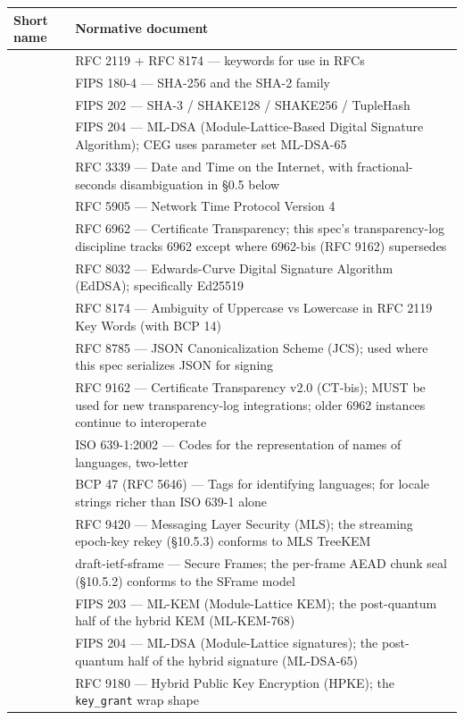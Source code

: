 \documentclass[10pt]{article}
\begin{document}
{\footnotesize
\begin{longtable}{|p{8.0cm}|p{8.0cm}|}\hline
\textbf{Short name} & \textbf{Normative document} \\ \hline\endhead
[BCP 14] & RFC 2119 + RFC 8174 — keywords for use in RFCs \\ \hline
[FIPS-180-4] & FIPS 180-4 — SHA-256 and the SHA-2 family \\ \hline
[FIPS-202] & FIPS 202 — SHA-3 / SHAKE128 / SHAKE256 / TupleHash \\ \hline
[FIPS-204] & FIPS 204 — ML-DSA (Module-Lattice-Based Digital Signature Algorithm); CEG uses parameter set ML-DSA-65 \\ \hline
[RFC-3339] & RFC 3339 — Date and Time on the Internet, with fractional-seconds disambiguation in §0.5 below \\ \hline
[RFC-5905] & RFC 5905 — Network Time Protocol Version 4 \\ \hline
[RFC-6962] & RFC 6962 — Certificate Transparency; this spec's transparency-log discipline tracks 6962 except where 6962-bis (RFC 9162) supersedes \\ \hline
[RFC-8032] & RFC 8032 — Edwards-Curve Digital Signature Algorithm (EdDSA); specifically Ed25519 \\ \hline
[RFC-8174] & RFC 8174 — Ambiguity of Uppercase vs Lowercase in RFC 2119 Key Words (with BCP 14) \\ \hline
[RFC-8785] & RFC 8785 — JSON Canonicalization Scheme (JCS); used where this spec serializes JSON for signing \\ \hline
[RFC-9162] & RFC 9162 — Certificate Transparency v2.0 (CT-bis); MUST be used for new transparency-log integrations; older 6962 instances continue to interoperate \\ \hline
[ISO-639-1] & ISO 639-1:2002 — Codes for the representation of names of languages, two-letter \\ \hline
[BCP-47] & BCP 47 (RFC 5646) — Tags for identifying languages; for locale strings richer than ISO 639-1 alone \\ \hline
[RFC-9420] & RFC 9420 — Messaging Layer Security (MLS); the streaming epoch-key rekey (§10.5.3) conforms to MLS TreeKEM \\ \hline
[SFrame] & draft-ietf-sframe — Secure Frames; the per-frame AEAD chunk seal (§10.5.2) conforms to the SFrame model \\ \hline
[FIPS-203] & FIPS 203 — ML-KEM (Module-Lattice KEM); the post-quantum half of the hybrid KEM (ML-KEM-768) \\ \hline
[FIPS-204] & FIPS 204 — ML-DSA (Module-Lattice signatures); the post-quantum half of the hybrid signature (ML-DSA-65) \\ \hline
[RFC-9180] & RFC 9180 — Hybrid Public Key Encryption (HPKE); the \texttt{key\_grant} wrap shape \\ \hline
\end{longtable}}
\end{document}
